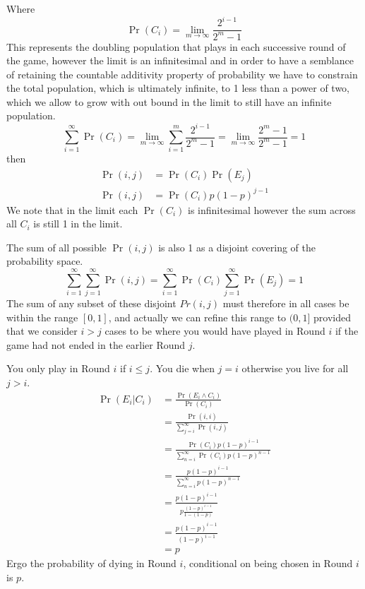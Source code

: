 \documentclass[article,twocolumn]{memoir}
\begin{document}
\begin{itemize}
{        Where
        $$\Pr(C_i) = \lim_{m\to\infty}\frac{2^{i-1}}{2^m-1}$$
        This represents the doubling population that plays in each successive round of the game, however the limit is an infinitesimal and in order to have a semblance of retaining the countable additivity property of probability we have to constrain the total population, which is ultimately infinite, to 1 less than a power of two, which we allow to grow with out bound in the limit to still have an infinite population. 
        $$\sum_{i=1}^\infty \Pr(C_i) = \lim_{m\to\infty}\sum_{i=1}^m\frac{2^{i-1}}{2^m-1}=\lim_{m\to\infty}\frac{2^m-1}{2^m-1}=1$$ 
        then
            \begin{align*}
              \Pr(i,j) & = \Pr(C_i)\Pr(E_j)\\
              \Pr(i,j) & = \Pr(C_i)p(1-p)^{j-1}
            \end{align*}
        We note that in the limit each $\Pr(C_i)$ is infinitesimal however the sum across all $C_i$ is still 1 in the limit.
        
        The sum of all possible $\Pr(i,j)$ is also 1 as a disjoint covering of the probability space.
        $$\sum_{i=1}^\infty\sum_{j=1}^\infty \Pr(i,j) =\sum_{i=1}^\infty \Pr(C_i)\sum_{j=1}^\infty\Pr(E_j) = 1 $$
        The sum of any subset of these disjoint $Pr(i,j)$ must therefore in all cases be within the range $[0,1]$, and actually we can refine this range to $(0,1]$ provided that we consider $i>j$ cases to be where you would have played in Round $i$ if the game had not ended in the earlier Round $j$.
        
        You only play in Round $i$ if $i\leq j$.  You die when $j=i$ otherwise you live for all $j>i$. 
            \begin{align*}
                 \Pr(E_i|C_i)&=\frac{\Pr(E_i\land C_i)}{\Pr(C_i)}\\ 
                 &=\frac{\Pr(i,i)}{\sum_{j=i}^\infty \Pr(i,j)}\\
                 &=\frac{\Pr(C_i)p(1-p)^{i-1}}{\sum_{n=i}^{\infty} \Pr(C_i)p(1-p)^{n-1}}\\
                 &=\frac{p(1-p)^{i-1}}{\sum_{n=i}^{\infty}p(1-p)^{n-1}}\\
                 &=\frac{p(1-p)^{i-1}}{p\frac{(1-p)^{i-1}}{1-(1-p)}}\\
                 &=\frac{p(1-p)^{i-1}}{(1-p)^{i-1}}\\
                 &=p
            \end{align*}
            Ergo the probability of dying in Round $i$, conditional on being chosen in Round $i$ is $p$.

}
\end{itemize}
\end{document}
